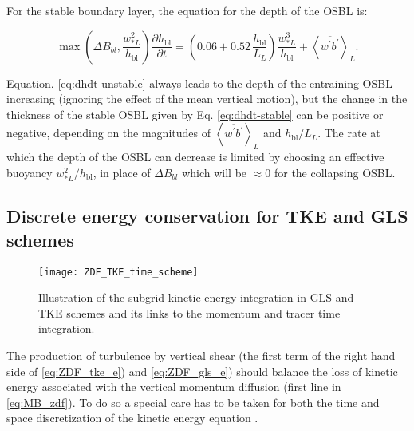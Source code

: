 \documentclass[../main/NEMO_manual]{subfiles}
\begin{document}
For the stable boundary layer, the equation for the depth of the OSBL is:

\begin{equation}\label{eq:dhdt-stable}
\max\left(\Delta B_{bl},\frac{w_{*L}^2}{h_\mathrm{bl}}\right)\frac{\partial h_\mathrm{bl}}{\partial t} = \left(0.06 + 0.52\,\frac{ h_\mathrm{bl}}{L_L}\right) \frac{w_{*L}^3}{h_\mathrm{bl}} +\left<\overline{w^\prime b^\prime}\right>_L.
\end{equation}

Equation. \ref{eq:dhdt-unstable} always leads to the depth of the entraining OSBL increasing (ignoring the effect of the mean vertical motion), but the change in the thickness of the stable OSBL given by Eq. \ref{eq:dhdt-stable} can be positive or negative, depending on the magnitudes of $\left<\overline{w^\prime b^\prime}\right>_L$ and $h_\mathrm{bl}/L_L$. The rate at which the depth of the OSBL can decrease is limited by choosing an effective buoyancy $w_{*L}^2/h_\mathrm{bl}$, in place of $\Delta B_{bl}$ which will be $\approx 0$ for the collapsing OSBL.


\subsection[ Discrete energy conservation for TKE and GLS schemes]{Discrete energy conservation for TKE and GLS schemes}
\label{subsec:ZDF_tke_ene}

\begin{figure}[!t]
  \centering
  \texttt{[image: ZDF\_TKE\_time\_scheme]}
  \caption[Subgrid kinetic energy integration in GLS and TKE schemes]{
    Illustration of the subgrid kinetic energy integration in GLS and TKE schemes and
    its links to the momentum and tracer time integration.}
  \label{fig:ZDF_TKE_time_scheme}
\end{figure}

The production of turbulence by vertical shear (the first term of the right hand side of
\autoref{eq:ZDF_tke_e}) and  \autoref{eq:ZDF_gls_e}) should balance the loss of kinetic energy associated with the vertical momentum diffusion
(first line in \autoref{eq:MB_zdf}).
To do so a special care has to be taken for both the time and space discretization of
the kinetic energy equation \citep{burchard_OM02,marsaleix.auclair.ea_OM08}.
\end{document}
